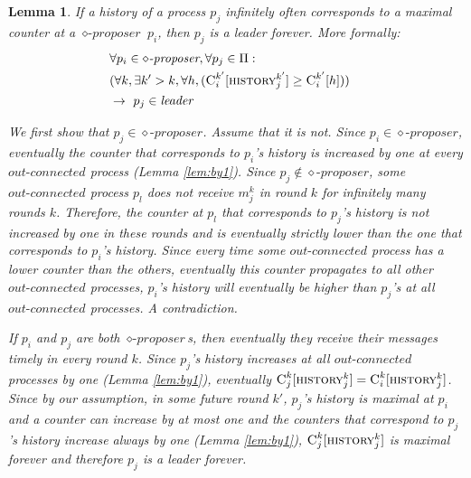 \documentclass[conference, compsoc]{IEEEtran}
\newtheorem{lemma}{Lemma}
\def\history{\textsc{history}}
\def\C{\textsc{C}}
\def\proposer{\diamond\textit{-proposer}}
\def\out{\textit{out-connected}}
\def\leader{\textit{leader}}
\def\m{m}
\begin{document}
\begin{lemma} \label{lem:infhigher}
If a history of a process $p_j$ infinitely often corresponds to a maximal counter at a $\proposer$ $p_i$, then $p_j$ is a leader forever. More formally:
 \begin{eqnarray*}
  & \forall p_i \in \proposer, \forall p_j \in \Pi: & \\
  & (\forall k, \exists k' > k, \forall h, 
       (\C_{i}^{k'} [\history_{j}^{k'}] \ge \C_{i}^{k'} [h]) ) & \\
  & \rightarrow \ p_j \in \leader &
 \end{eqnarray*}
 
 \begin{IEEEproof}
 We first show that $p_j \in \proposer$. Assume that it is not. Since $p_i \in \proposer$, eventually the counter that corresponds to $p_i$'s history is increased by one at every $\out$ process (Lemma \ref{lem:by1}). Since $p_j \not\in \proposer$, some $\out$ process $p_l$ does not receive $\m_{j}^k$ in round $k$ for infinitely many rounds $k$. Therefore, the counter at $p_l$ that corresponds to $p_j$'s history is not increased by one in these rounds and is eventually  strictly lower than the one that corresponds to $p_i$'s history. Since every time some $\out$ process has a lower counter than the others, eventually this counter propagates to all other $\out$ processes, $p_i$'s history will eventually be higher than $p_j$'s at all $\out$ processes. A contradiction.
  
 If $p_i$ and $p_j$ are both $\proposer$s, then eventually they receive their messages timely in every round $k$. Since $p_j$'s history increases at all $\out$ processes by one (Lemma \ref{lem:by1}), eventually $\C_{j}^{k} [\history_{j}^{k}] = \C_{i}^{k} [\history_{j}^{k}]$. Since by our assumption, in some future round $k'$, $p_j$'s history is maximal at $p_i$ and a counter can increase by at most one and the counters that correspond to $p_j$'s history increase always by one (Lemma \ref{lem:by1}), $\C_{j}^{k} [\history_{j}^{k}]$ is maximal forever and therefore $p_j$ is a leader forever.
 \end{IEEEproof}
\end{lemma}
\end{document}

